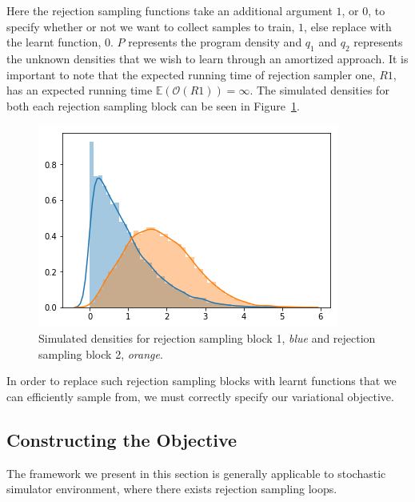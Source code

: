 \documentclass{article}
\begin{document}
Here the rejection sampling functions take an additional argument $1$, or $0$,
to specify whether or not we want to collect samples to train, $1$, else replace with 
the learnt function, $0$. $P$ represents the program density and $q_{1}$ and $q_{2}$ represents 
the unknown densities that we wish to learn through an amortized approach.
It is important to note that the expected running time of rejection sampler one, $R1$, 
has an expected running time $\mathbb{E}(\mathcal{O}(R1)) = \infty$. 
The simulated densities for both each rejection sampling block can be seen in Figure~\ref{fig:rs_simulated}.
\begin{figure}
  \centering
  \includegraphics{rs_plots.png}
  \caption{ Simulated densities for rejection sampling block 1, \emph{blue} and rejection
  sampling block 2, \emph{orange}.}
  \label{fig:rs_simulated}
\end{figure}

In order to replace such rejection sampling blocks with learnt functions that we 
can efficiently sample from, we must correctly specify our variational objective.

\subsection{Constructing the Objective}

The framework we present in this section is generally applicable to stochastic simulator 
environment, where there exists rejection sampling loops. 
\end{document}
